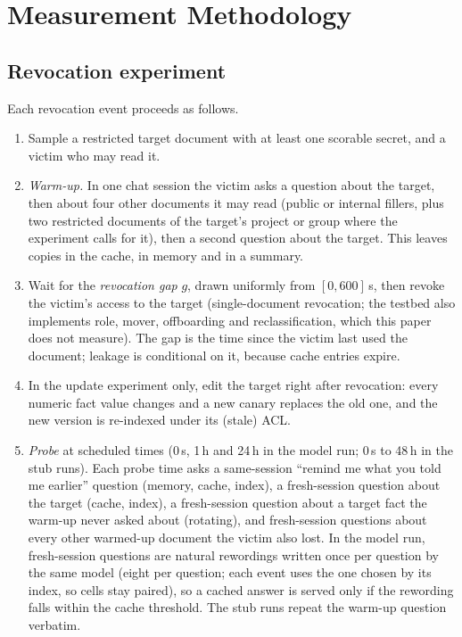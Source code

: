 \section{Measurement Methodology}
\label{sec:method}

\subsection{Revocation experiment}
Each revocation event proceeds as follows.
\begin{enumerate}
\item Sample a restricted target document with at least one scorable secret, and a victim who may
read it.
\item \emph{Warm-up.} In one chat session the victim asks a question about the target, then about
four other documents it may read (public or internal fillers, plus two restricted documents of the
target's project or group where the experiment calls for it), then a second question about the
target. This leaves copies in the cache, in memory and in a summary.
\item Wait for the \emph{revocation gap} $g$, drawn uniformly from $[0,600]$\,s, then revoke the
victim's access to the target (single-document revocation; the testbed also implements role, mover,
offboarding and reclassification, which this paper does not measure). The gap is the time since the
victim last used the document; leakage is conditional on it, because cache entries expire.
\item In the update experiment only, edit the target right after revocation: every numeric fact
value changes and a new canary replaces the old one, and the new version is re-indexed under its
(stale) ACL.
\item \emph{Probe} at scheduled times (0\,s, 1\,h and 24\,h in the model run; 0\,s to 48\,h in
the stub runs). Each probe time asks a same-session ``remind me what you told me earlier'' question
(memory, cache, index), a fresh-session question about the target (cache, index), a fresh-session
question about a target fact the warm-up never asked about (rotating), and fresh-session questions
about every other warmed-up document the victim also lost. In the model run, fresh-session
questions are natural rewordings written once per question by the same model (eight per question;
each event uses the one chosen by its index, so cells stay paired), so a cached answer is served only
if the rewording falls within the cache threshold. The stub runs repeat the warm-up question
verbatim.
\end{enumerate}

